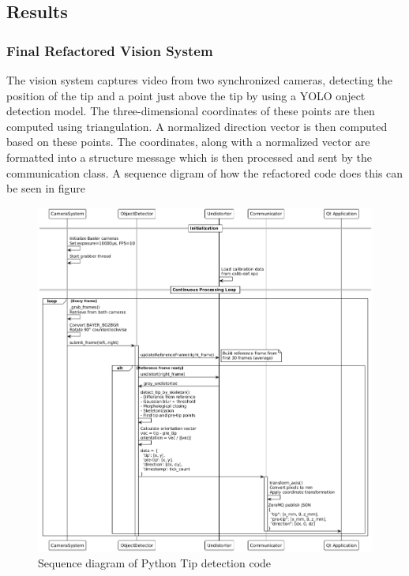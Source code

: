 \subsection{Results}

\subsubsection{Final Refactored Vision System}


The vision system captures video from two synchronized cameras, detecting the position of the tip and a point just above   the tip by using a YOLO onject detection model. The three-dimensional coordinates of these points are then computed using triangulation. A normalized direction vector is then computed based on these points. The coordinates, along with a normalized vector are formatted into a structure message which is then processed and sent by the communication class. A sequence digram of how the refactored code does this can be seen in figure

\begin{figure}
    \centering
    \includegraphics[width=1.1\linewidth]{images/vision/pythonSequencediag.png}
    \caption{Sequence diagram of Python Tip detection code}
    \label{fig:seqpython}
\end{figure}

